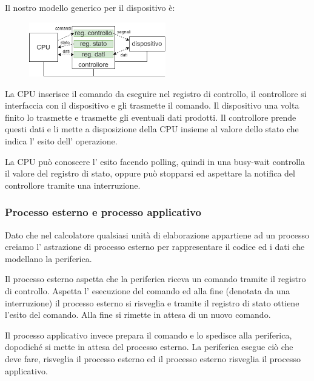 Il nostro modello generico per il dispositivo è:
\begin{figure}[H]
    \centering
    \includegraphics[width=225px]{images/10_Gestione_delle_periferiche/device_logic_scheme.png}
\end{figure}
La CPU inserisce il comando da eseguire nel registro di controllo, il controllore si interfaccia con il dispositivo e gli trasmette il comando.
Il dispositivo una volta finito lo trasmette e trasmette gli eventuali dati prodotti.
Il controllore prende questi dati e li mette a disposizione della CPU insieme al valore dello stato che indica l' esito dell' operazione.

La CPU può conoscere l' esito facendo polling, quindi in una busy-wait controlla il valore del registro di stato, oppure può stopparsi ed aspettare la notifica del controllore tramite una interruzione.

\subsubsection{Processo esterno e processo applicativo}
Dato che nel calcolatore qualsiasi unità di elaborazione appartiene ad un processo creiamo l' astrazione di processo esterno per rappresentare il codice ed i dati che modellano la periferica.

Il processo esterno aspetta che la periferica riceva un comando tramite il registro di controllo.
Aspetta l' esecuzione del comando ed alla fine (denotata da una interruzione) il processo esterno si risveglia e tramite il registro di stato ottiene l'esito del comando.
Alla fine si rimette in attesa di un nuovo comando.

Il processo applicativo invece prepara il comando e lo spedisce alla periferica, dopodiché si mette in attesa del processo esterno.
La periferica esegue ciò che deve fare, risveglia il processo esterno ed il processo esterno risveglia il processo applicativo.

